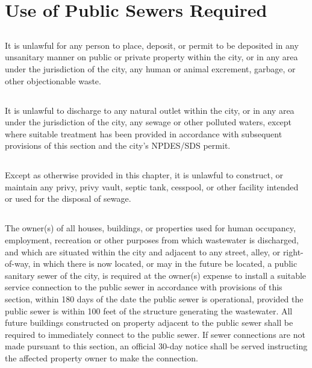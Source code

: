 \section{Use of Public Sewers Required}
\subsection{}
It is unlawful for any person to place, deposit, or permit to be deposited in any unsanitary manner on public or private property within the city, or in any area under the jurisdiction of the city, any human or animal excrement, garbage, or other objectionable waste.
\subsection{}
It is unlawful to discharge to any natural outlet within the city, or in any area under the jurisdiction of the city, any sewage or other polluted waters, except where suitable treatment has been provided in accordance with subsequent provisions of this section and the city’s NPDES/SDS permit.
\subsection{}
Except as otherwise provided in this chapter, it is unlawful to construct, or maintain any privy, privy vault, septic tank, cesspool, or other facility intended or used for the disposal of sewage.
\subsection{}
The owner(s) of all houses, buildings, or properties used for human occupancy, employment, recreation or other purposes from which wastewater is discharged, and which are situated within the city and adjacent to any street, alley, or right-of-way, in which there is now located, or may in the future be located, a public sanitary sewer of the city, is required at the owner(s) expense to install a suitable service connection to the public sewer in accordance with provisions of this section, within 180 days of the date the public sewer is operational, provided the public sewer is within 100 feet of the structure generating the wastewater.  All future buildings constructed on property adjacent to the public sewer shall be required to immediately connect to the public sewer.  If sewer connections are not made pursuant to this section, an official 30-day notice shall be served instructing the affected property owner to make the connection.
